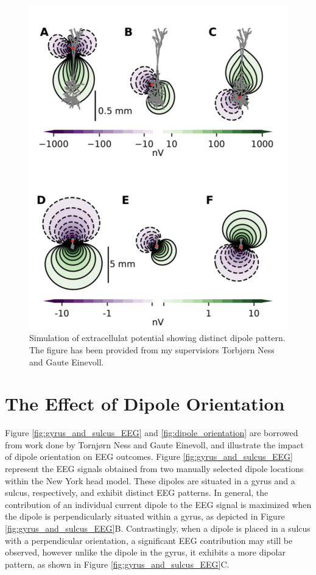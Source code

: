 \documentclass[a4paper, UKenglish, 11pt]{uiomaster}
\begin{document}
\begin{figure}
    \centering
    \includegraphics[width=\linewidth]{figures/dipole_pattern.png}
    \caption{Simulation of extracellulat potential showing distinct dipole pattern. The figure has been provided from my supervisiors Torbjørn Ness and Gaute Einevoll.}
    \label{fig:dipole_pattern}
\end{figure}

\section{The Effect of Dipole Orientation}
Figure \ref{fig:gyrus_and_sulcus_EEG} and \ref{fig:dipole_orientation} are borrowed from work done by Tornjørn Ness and Gaute Einevoll, and illustrate the impact of dipole orientation on EEG outcomes. Figure \ref{fig:gyrus_and_sulcus_EEG} represent the EEG signals obtained from two manually selected dipole locations within the New York head model. These dipoles are situated in a gyrus and a sulcus, respectively, and exhibit distinct EEG patterns. In general, the contribution of an individual current dipole to the EEG signal is maximized when the dipole is perpendicularly situated within a gyrus, as depicted in Figure \ref{fig:gyrus_and_sulcus_EEG}B. Contrastingly, when a dipole is placed in a sulcus with a perpendicular orientation, a significant EEG contribution may still be observed, however unlike the dipole in the gyrus, it exhibits a more dipolar pattern, as shown in Figure \ref{fig:gyrus_and_sulcus_EEG}C.
\end{document}
